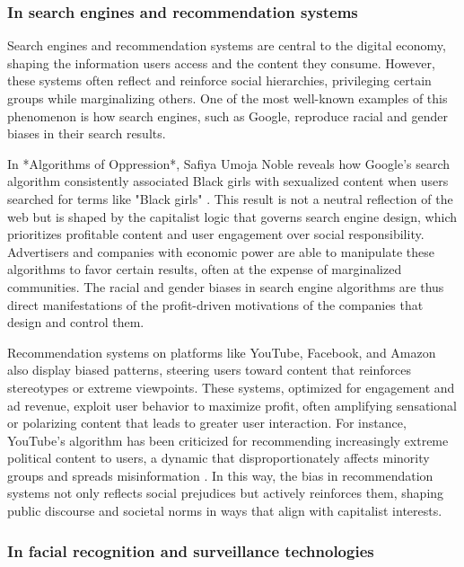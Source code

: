 \begin{refsection}
\subsubsection{In search engines and recommendation systems}

Search engines and recommendation systems are central to the digital economy, shaping the information users access and the content they consume. However, these systems often reflect and reinforce social hierarchies, privileging certain groups while marginalizing others. One of the most well-known examples of this phenomenon is how search engines, such as Google, reproduce racial and gender biases in their search results.

In *Algorithms of Oppression*, Safiya Umoja Noble reveals how Google’s search algorithm consistently associated Black girls with sexualized content when users searched for terms like "Black girls" \cite[pp.~64-66]{noble2019}. This result is not a neutral reflection of the web but is shaped by the capitalist logic that governs search engine design, which prioritizes profitable content and user engagement over social responsibility. Advertisers and companies with economic power are able to manipulate these algorithms to favor certain results, often at the expense of marginalized communities. The racial and gender biases in search engine algorithms are thus direct manifestations of the profit-driven motivations of the companies that design and control them.

Recommendation systems on platforms like YouTube, Facebook, and Amazon also display biased patterns, steering users toward content that reinforces stereotypes or extreme viewpoints. These systems, optimized for engagement and ad revenue, exploit user behavior to maximize profit, often amplifying sensational or polarizing content that leads to greater user interaction. For instance, YouTube’s algorithm has been criticized for recommending increasingly extreme political content to users, a dynamic that disproportionately affects minority groups and spreads misinformation \cite[pp.~23-26]{tufekci2018}. In this way, the bias in recommendation systems not only reflects social prejudices but actively reinforces them, shaping public discourse and societal norms in ways that align with capitalist interests.

\subsubsection{In facial recognition and surveillance technologies}


\end{refsection}

